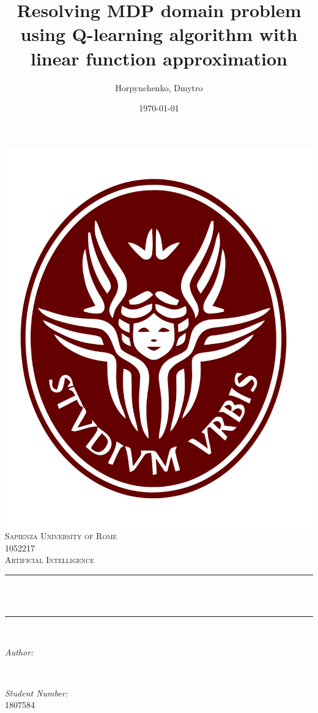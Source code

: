 \documentclass[12pt]{article}
\title{Resolving MDP domain problem using Q-learning algorithm with linear function approximation}			%
\author{Horpynchenko, Dmytro} 								%
\date{\today}											%
\makeatletter
\let\thetitle\@title
\let\theauthor\@author
\makeatother
\begin{document}

\begin{titlepage}
	\centering
    \includegraphics[scale = 0.2]{images/sapienza_logo_only.png}\\[1.0 cm]	%
    \textsc{\LARGE Sapienza University of Rome}\\[2.0 cm]	%
	\textsc{\Large 1052217}\\[0.5 cm]				%
	\textsc{\large Artificial Intelligence}\\[0.5 cm]				%
	\rule{\linewidth}{0.2 mm} \\[0.4 cm]
	{ \huge \bfseries \thetitle}\\
	\rule{\linewidth}{0.2 mm} \\[1.5 cm]

	\begin{minipage}{0.4\textwidth}
		\begin{flushleft} \large
			\emph{Author:}\\
			\theauthor
			\end{flushleft}
			\end{minipage}~
			\begin{minipage}{0.4\textwidth}
			\begin{flushright} \large
			\emph{Student Number:} \\
			1807584				%
		\end{flushright}
	\end{minipage}\\[2 cm]


	\vfill

\end{titlepage}
\end{document}
